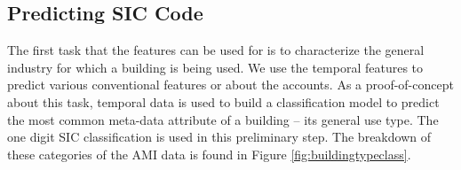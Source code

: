 \subsection{Predicting SIC Code}
\label{sec:predictinsiccode}

The first task that the features can be used for is to characterize the general industry for which a building is being used. We use the temporal features to predict various conventional features or about the accounts. As a proof-of-concept about this task, temporal data is used to build a classification model to predict the most common meta-data attribute of a building – its general use type. The one digit SIC classification is used in this preliminary step. The breakdown of these categories of the AMI data is found in Figure \ref{fig:buildingtypeclass}.




